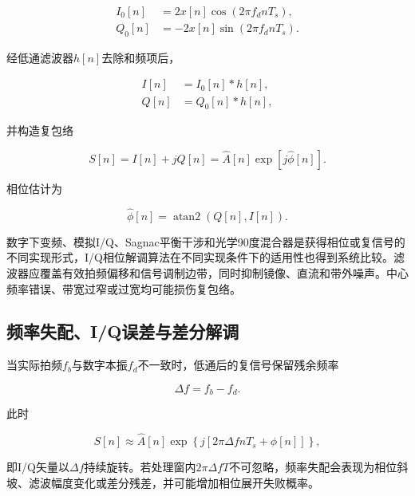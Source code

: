 \begin{align}
I_0[n]&=2x[n]\cos(2\pi f_d nT_s),\\
Q_0[n]&=-2x[n]\sin(2\pi f_d nT_s).
\end{align}

经低通滤波器$h[n]$去除和频项后，

\begin{align}
I[n]&=I_0[n]*h[n],\\
Q[n]&=Q_0[n]*h[n],
\end{align}

并构造复包络

\begin{equation}
S[n]=I[n]+jQ[n]=\hat A[n]\exp\!\left[j\hat\phi[n]\right].
\label{eq:complex_envelope}
\end{equation}

相位估计为

\begin{equation}
\hat\phi[n]
=
\operatorname{atan2}\!\left(Q[n],I[n]\right).
\label{eq:atan2}
\end{equation}

数字下变频、模拟I/Q、Sagnac平衡干涉和光学90度混合器是获得相位或复信号的不同实现形式，I/Q相位解调算法在不同实现条件下的适用性也得到系统比较\cite{fu2018iq,jiang2019analog,zhong2021sagnac,kong2025iq_thesis}。滤波器应覆盖有效拍频偏移和信号调制边带，同时抑制镜像、直流和带外噪声。中心频率错误、带宽过窄或过宽均可能损伤复包络\cite{zhang2025if,zhu2024downsampling}。

\subsection{频率失配、I/Q误差与差分解调}

当实际拍频$f_b$与数字本振$f_d$不一致时，低通后的复信号保留残余频率

\begin{equation}
\Delta f=f_b-f_d.
\label{eq:frequency_mismatch}
\end{equation}

此时

\begin{equation}
S[n]
\approx
\hat A[n]\exp\!\left\{
j\left[
2\pi\Delta f nT_s+\phi[n]
\right]
\right\},
\label{eq:residual_rotation}
\end{equation}

即I/Q矢量以$\Delta f$持续旋转。若处理窗内$2\pi\Delta f T$不可忽略，频率失配会表现为相位斜坡、滤波幅度变化或差分残差，并可能增加相位展开失败概率\cite{zhong2021frequency,qian2025drift}。

